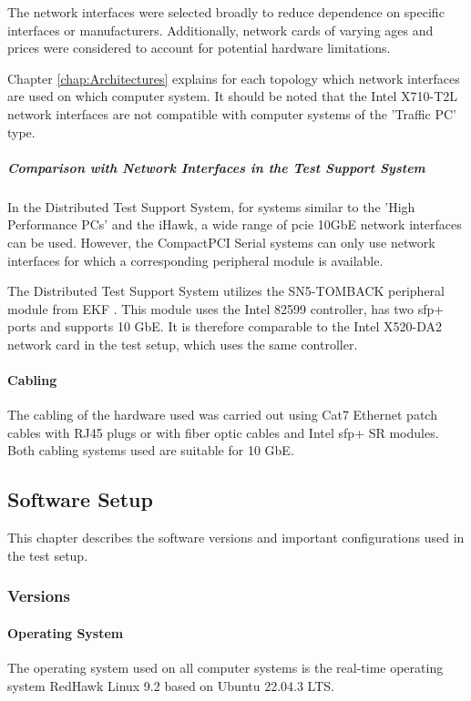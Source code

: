 The network interfaces were selected broadly to reduce dependence on specific interfaces or manufacturers. Additionally, network cards of varying ages and prices were considered to account for potential hardware limitations.

Chapter \ref{chap:Architectures} explains for each topology which network interfaces are used on which computer system. It should be noted that the Intel X710-T2L network interfaces are not compatible with computer systems of the 'Traffic PC' type.


\subparagraph{Comparison with Network Interfaces in the Test Support System}

In the Distributed Test Support System, for systems similar to the 'High Performance PCs' and the iHawk, a wide range of \ac{pcie} 10GbE network interfaces can be used. However, the CompactPCI Serial systems can only use network interfaces for which a corresponding peripheral module is available.

The Distributed Test Support System utilizes the SN5-TOMBACK peripheral module from EKF \cite{setupnw05}. This module uses the Intel 82599 controller, has two \ac{sfp}+ ports and supports 10 GbE. It is therefore comparable to the Intel X520-DA2 network card in the test setup, which uses the same controller.

\paragraph{Cabling}
The cabling of the hardware used was carried out using Cat7 Ethernet patch cables with RJ45 plugs or with fiber optic cables and Intel \ac{sfp}+ SR modules. Both cabling systems used are suitable for 10 GbE.

\subsection{Software Setup}
This chapter describes the software versions and important configurations used in the test setup.

\subsubsection{Versions}
\paragraph{Operating System}
The operating system used on all computer systems is the real-time operating system RedHawk Linux 9.2 based on Ubuntu 22.04.3 LTS.

